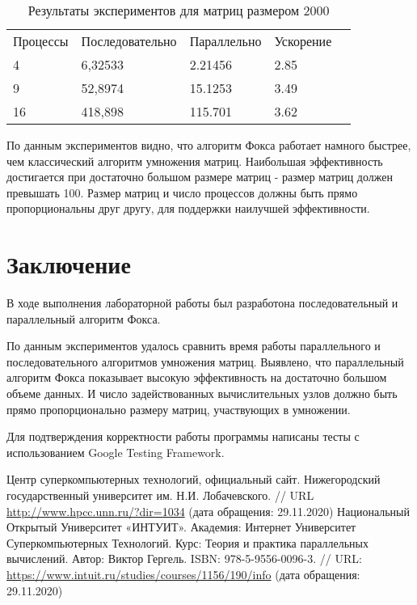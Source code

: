 \documentclass{report}
\begin{document}
\begin{table}[!h]
\caption{Результаты экспериментов для матриц размером 2000}
\centering
\begin{tabular}{lllll}
Процессы & Последовательно & Параллельно & Ускорение  \\
4        & 6,32533         & 2.21456     & 2.85       \\
9        & 52,8974         & 15.1253     & 3.49       \\
16       & 418,898         & 115.701     & 3.62       
\end{tabular}
\end{table}


\par По данным экспериментов видно, что алгоритм Фокса работает намного быстрее, чем
классический алгоритм умножения матриц. Наибольшая эффективность достигается при
достаточно большом размере матриц - размер матриц должен превышать 100. Размер матриц и число процессов должны быть прямо пропорциональны друг другу, для поддержки наилучшей эффективности.
\newpage

\section*{Заключение}
В ходе выполнения лабораторной работы был разработона последовательный и параллельный алгоритм Фокса.
\par По данным экспериментов удалось сравнить время работы параллельного и последовательного алгоритмов умножения матриц. Выявлено, что параллельный алгоритм Фокса показывает высокую эффективность на достаточно большом объеме данных. И число задействованных вычислительных узлов должно быть прямо пропорционально размеру матриц, участвующих в умножении.
\par Для подтверждения корректности работы программы написаны тесты с использованием Google Testing Framework.
\newpage

\begin{thebibliography}{1}
 Центр суперкомпьютерных технологий, официальный сайт. Нижегородский
государственный университет им. Н.И. Лобачевского.  // URL \url {http://www.hpcc.unn.ru/?dir=1034} (дата обращения: 29.11.2020)
 Национальный Открытый Университет «ИНТУИТ». Академия: Интернет Университет Суперкомпьютерных Технологий. Курс: Теория и практика параллельных вычислений. Автор: Виктор Гергель. ISBN: 978-5-9556-0096-3. // URL: \url {https://www.intuit.ru/studies/courses/1156/190/info} (дата обращения: 29.11.2020)
\end{thebibliography}
\newpage
\end{document}
